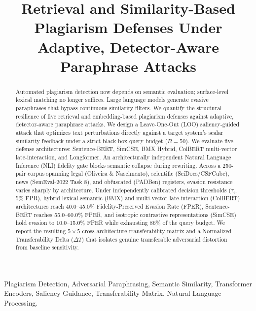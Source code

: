 \documentclass[conference,onecolumn,11pt]{IEEEtran}
\begin{document}
\title{Retrieval and Similarity-Based Plagiarism Defenses Under Adaptive, Detector-Aware Paraphrase Attacks}

\author{
}

\maketitle

\begin{abstract}
Automated plagiarism detection now depends on semantic evaluation; surface-level lexical matching no longer suffices. Large language models generate evasive paraphrases that bypass continuous similarity filters. We quantify the structural resilience of five retrieval and embedding-based plagiarism defenses against adaptive, detector-aware paraphrase attacks. We design a Leave-One-Out (LOO) saliency-guided attack that optimizes text perturbations directly against a target system's scalar similarity feedback under a strict black-box query budget ($B = 50$). We evaluate five defense architectures: Sentence-BERT, SimCSE, BMX Hybrid, ColBERT multi-vector late-interaction, and Longformer. An architecturally independent Natural Language Inference (NLI) fidelity gate blocks semantic collapse during rewriting. Across a 250-pair corpus spanning legal (Oliveira \& Nascimento), scientific (SciDocs/CSFCube), news (SemEval-2022 Task 8), and obfuscated (PADBen) registers, evasion resistance varies sharply by architecture. Under independently calibrated decision thresholds ($\tau_i$, 5\% FPR), hybrid lexical-semantic (BMX) and multi-vector late-interaction (ColBERT) architectures reach 40.0--45.0\% Fidelity-Preserved Evasion Rate (FPER), Sentence-BERT reaches 55.0--60.0\% FPER, and isotropic contrastive representations (SimCSE) hold evasion to 10.0--15.0\% FPER while exhausting 86\% of the query budget. We report the resulting $5 \times 5$ cross-architecture transferability matrix and a Normalized Transferability Delta ($\Delta T$) that isolates genuine transferable adversarial distortion from baseline sensitivity.
\end{abstract}

\begin{IEEEkeywords}
Plagiarism Detection, Adversarial Paraphrasing, Semantic Similarity, Transformer Encoders, Saliency Guidance, Transferability Matrix, Natural Language Processing.
\end{IEEEkeywords}
\end{document}
